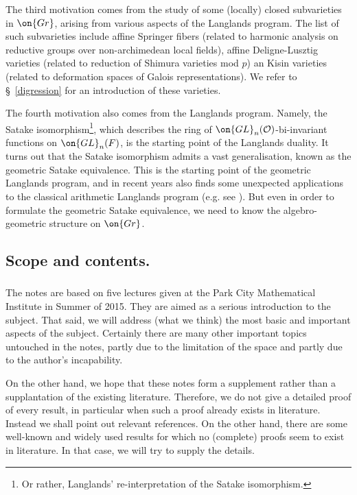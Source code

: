 \documentclass[]{pcmi}
\theoremstyle{plain}
\theoremstyle{remark}
\theoremstyle{definition}
\newcommand{\mO}{{\mathcal O}}
\newcommand{\Gr}{{\on{Gr}}}
\newcommand{\GL}{{\on{GL}}}
\begin{document}
The third motivation comes from the study of some (locally) closed subvarieties in $\Gr$, arising from various aspects of the Langlands program. The list of such subvarieties include affine Springer fibers (related to harmonic analysis on reductive groups over non-archimedean local fields), affine Deligne-Lusztig varieties (related to reduction of Shimura varieties mod $p$) an Kisin varieties (related to deformation spaces of Galois representations). We refer to \S\ \ref{digression} for an introduction of these varieties.


The fourth motivation also comes from the Langlands program. Namely, the Satake isomorphism\footnote{Or rather, Langlands' re-interpretation of the Satake isomorphism.}, which describes the ring of $\GL_n(\mO)$-bi-invariant functions on $\GL_n(F)$, is the starting point of the Langlands duality. It turns out that the Satake isomorphism admits a vast generalisation, known as the geometric Satake equivalence. This is the starting point of the geometric Langlands program, and in recent years also finds some unexpected applications to the classical arithmetic Langlands program (e.g. see \cite{Laf}). But even in order to formulate the geometric Satake equivalence, we need to know the algebro-geometric structure on $\Gr$.

\subsection{Scope and contents.}

\subsubsection{}The notes are based on five lectures given at the Park City Mathematical Institute in Summer of 2015. They are aimed as a serious introduction to the subject. That said, we will address (what we think) the most basic and important aspects of the subject. Certainly there are many other important topics untouched in the notes, partly due to the limitation of the space and partly due to the author's incapability.  

On the other hand, we hope that these notes form a supplement rather than a supplantation of the existing literature. Therefore, we do not give a detailed proof of every result, in particular when such a proof already exists in literature. Instead we shall point out relevant references. On the other hand, there are some well-known and widely used results for which no (complete) proofs seem to exist in literature. In that case, we will try to supply the details.
\end{document}
